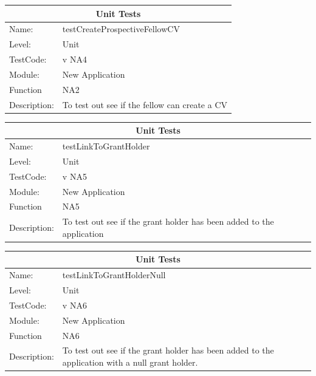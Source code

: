 \documentclass[12pt]{article}
\begin{document}
\begin{center}
\begin{tabular}{|l|p{12cm}|}
\hline
\multicolumn{2}{|c|}{\bf Unit Tests} \\
\hline
 Name: & testCreateProspectiveFellowCV  \\
\hline
Level: & Unit \\
\hline
TestCode: & v NA4 \\
\hline
Module:& New Application\\
\hline
Function & NA2 \\
\hline
Description: & To test out see if the fellow can  create a CV  \\
\hline

\end{tabular}
\end{center}

\begin{center}
\begin{tabular}{|l|p{12cm}|}
\hline
\multicolumn{2}{|c|}{\bf Unit Tests} \\
\hline
 Name: & testLinkToGrantHolder  \\
\hline
Level: & Unit \\
\hline
TestCode: & v NA5 \\
\hline
Module:& New Application\\
\hline
Function & NA5 \\
\hline
Description: & To test out see if the grant holder has been added to the application  \\
\hline

\end{tabular}
\end{center}

\begin{center}
\begin{tabular}{|l|p{12cm}|}
\hline
\multicolumn{2}{|c|}{\bf Unit Tests} \\
\hline
 Name: & testLinkToGrantHolderNull  \\
\hline
Level: & Unit \\
\hline
TestCode: & v NA6 \\
\hline
Module:& New Application\\
\hline
Function & NA6 \\
\hline
Description: & To test out see if the grant holder has been added to the application with a null grant holder.  \\
\hline

\end{tabular}
\end{center}
\end{document}
